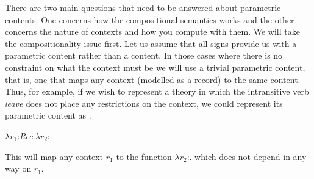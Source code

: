 There are two main questions that need to be answered about parametric
contents.  One concerns how the compositional semantics works and the
other concerns the nature of contexts and how you compute with them.
We will take the compositionality issue first.  Let us assume that all
signs provide us with a parametric content rather than a content.  In
those cases where there is no constraint on what the context must be
we will use a trivial parametric content, that is, one that maps any
context (modelled as a record) to the same content.  Thus, for
example, if we wish to represent a theory in which the intransitive
verb \textit{leave} does not place any restrictions on the context, we
could represent its parametric content as \nexteg{}.
\begin{ex} 
$\lambda r_1$:\textit{Rec}.$\lambda r_2$:.
\label{ex:parametricLeave}
\end{ex}
This will map any context $r_1$ to the function $\lambda r_2$:.
 which does not depend in
any way on $r_1$.

